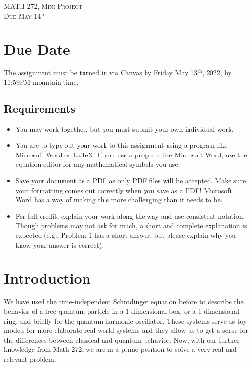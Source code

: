 \documentclass{article}
\begin{document}
\begin{center}
   \LARGE{\textsc{MATH 272, Mini Project}}\\
   \large{\textsc{Due May 14$^\textrm{th}$}}
\end{center}
\vspace{.5cm}


\section*{Due Date}
The assignment must be turned in via Canvas by Friday May 13$^\textrm{th}$, 2022, by 11:59PM mountain time.
\subsection*{Requirements}
\begin{itemize}
    \item You may work together, but you must submit your own individual work.
    \item You are to type out your work to this assignment using a program like Microsoft Word or \LaTeX. If you use a program like Microsoft Word, use the equation editor for any mathematical symbols you use. 
    \item Save your document as a PDF as only PDF files will be accepted. Make sure your formatting comes out correctly when you save as a PDF! Microsoft Word has a way of making this more challenging than it needs to be.
    \item For full credit, explain your work along the way and use consistent notation.  Though problems may not ask for much, a short and complete explanation is expected (e.g., Problem 1 has a short answer, but please explain why you know your answer is correct).
\end{itemize}


\section{Introduction}

We have used the time-independent Schr\"odinger equation before to describe the behavior of a free quantum particle in a 1-dimensional box, or a 1-dimensional ring, and briefly for the quantum harmonic oscillator.  These systems serve as toy models for more elaborate real world systems and they allow us to get a sense for the differences between classical and quantum behavior. Now, with our further knowledge from Math 272, we are in a prime position to solve a very real and relevant problem.
\end{document}
